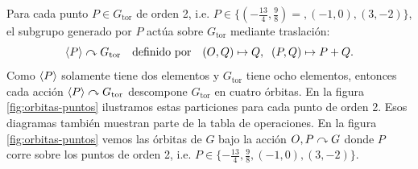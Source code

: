 \documentclass[../../tesis_maestria]{subfiles}
\begin{document}
Para cada punto $P\in G_\mathrm{tor}$ de orden 2, i.e. $P\in\{(-\tfrac{13}{4},\tfrac{9}{8})=,(-1,0),(3,-2)\}$, el subgrupo generado por $P$ actúa sobre $G_\mathrm{tor}$ mediante traslación:
\[
	\langle P \rangle\curvearrowright G_\mathrm{tor}\quad\text{definido por}\quad (O,Q)\mapsto Q,\;\; (P,Q)\mapsto P+Q.
\]
Como $\langle P \rangle$ solamente tiene dos elementos y $G_\mathrm{tor}$ tiene ocho elementos, entonces cada acción $\langle P \rangle\curvearrowright G_\mathrm{tor}$ descompone $G_\mathrm{tor}$ en cuatro órbitas. En la figura \ref{fig:orbitas-puntos} ilustramos estas particiones para cada punto de orden 2. Esos diagramas también muestran parte de la tabla de operaciones. En la figura \ref{fig:orbitas-puntos} vemos las órbitas de $G$ bajo la acción ${O,P}\curvearrowright G$ donde $P$ corre sobre los puntos de orden 2, i.e. $P\in\{-\tfrac{13}{4},\tfrac{9}{8},(-1,0),(3,-2)\}$.
\end{document}
